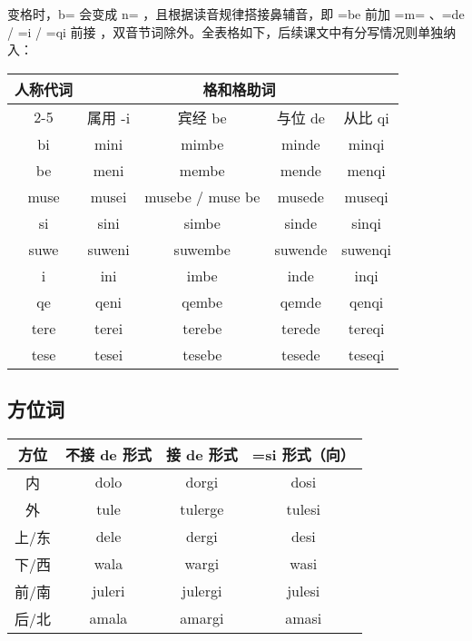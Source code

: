 变格时，b= 会变成 n= ，且根据读音规律搭接鼻辅音，即 =be 前加 =m= 、=de / =i / =qi 前接 ，双音节词除外。全表格如下，后续课文中有分写情况则单独纳入：

\begin{center}
    \begin{tabular}{c|c|c|c|c}
        \toprule
        \multirow{3}{*}{人称代词} & \multicolumn{4}{c}{格和格助词} \\
        \cline{2-5}
            & 属用 -i & 宾经 be & 与位 de & 从比 qi\\
        \midrule
        bi & mini & mimbe & minde & minqi \\
        be & meni & membe & mende & menqi \\
        \hline
        muse & musei & musebe / muse be & musede & museqi \\
        \hline
        si & sini & simbe & sinde & sinqi \\
        suwe & suweni & suwembe & suwende & suwenqi \\
        \hline
        i & ini & imbe & inde & inqi \\
        qe & qeni & qembe & qemde & qenqi \\
        \hline
        tere & terei & terebe & terede & tereqi \\
        tese & tesei & tesebe & tesede & teseqi \\
        \bottomrule
    \end{tabular}
\end{center}

\subsection{方位词}

\begin{center}
    \begin{tabular}{c|c|c|c}
        \toprule
       方位 & 不接 de 形式 & 接 de 形式 & =si 形式（向）\\
       \midrule
       内 & dolo & dorgi & dosi \\
       外 & tule & tulerge & tulesi \\
       上/东 & dele & dergi & desi \\
       下/西 & wala & wargi & wasi \\
       前/南 & juleri & julergi & julesi \\
       后/北 & amala & amargi & amasi \\
        \bottomrule
    \end{tabular}
\end{center}

